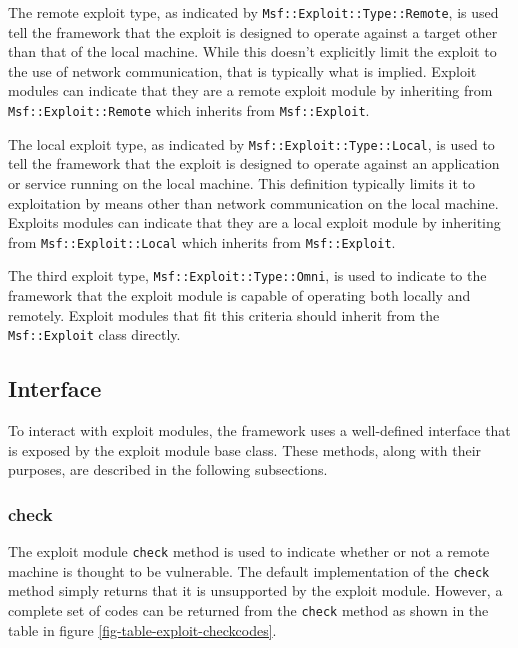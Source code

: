 \documentclass{report}
\begin{document}
\par
The remote exploit type, as indicated by
\texttt{Msf::Exploit::Type::Remote}, is used tell the framework that
the exploit is designed to operate against a target other than that
of the local machine.  While this doesn't explicitly limit the
exploit to the use of network communication, that is typically what
is implied.  Exploit modules can indicate that they are a remote
exploit module by inheriting from \texttt{Msf::Exploit::Remote}
which inherits from \texttt{Msf::Exploit}.

\par
The local exploit type, as indicated by
\texttt{Msf::Exploit::Type::Local}, is used to tell the framework
that the exploit is designed to operate against an application or
service running on the local machine.  This definition typically
limits it to exploitation by means other than network communication
on the local machine.  Exploits modules can indicate that they are a
local exploit module by inheriting from \texttt{Msf::Exploit::Local}
which inherits from \texttt{Msf::Exploit}.

\par
The third exploit type, \texttt{Msf::Exploit::Type::Omni}, is used
to indicate to the framework that the exploit module is capable of
operating both locally and remotely.  Exploit modules that fit this
criteria should inherit from the \texttt{Msf::Exploit} class
directly.

        \subsection{Interface}

\par
To interact with exploit modules, the framework uses a well-defined
interface that is exposed by the exploit module base class.  These
methods, along with their purposes, are described in the following
subsections.

            \subsubsection{check}

\par
The exploit module \texttt{check} method is used to indicate whether
or not a remote machine is thought to be vulnerable.  The default
implementation of the \texttt{check} method simply returns that it
is unsupported by the exploit module.  However, a complete set of
codes can be returned from the \texttt{check} method as shown in the
table in figure \ref{fig-table-exploit-checkcodes}.
\end{document}
